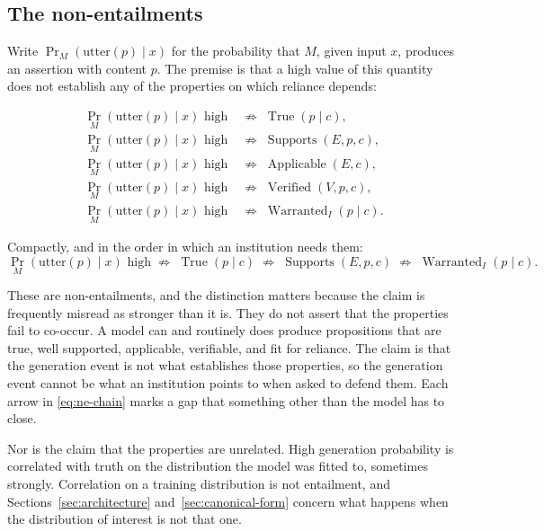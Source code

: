 \documentclass[11pt]{article}
\newcommand{\Supports}{\operatorname{Supports}}
\newcommand{\Applicable}{\operatorname{Applicable}}
\newcommand{\nentails}{\;\not\Rightarrow\;}
\newcommand{\Warranted}{\operatorname{Warranted}}
\newcommand{\Verified}{\operatorname{Verified}}
\newcommand{\True}{\operatorname{True}}
\theoremstyle{plain}
\theoremstyle{definition}
\begin{document}
\subsection{The non-entailments}

Write $\Pr_M(\mathrm{utter}(p) \mid x)$ for the probability that $M$, given input
$x$, produces an assertion with content $p$. The premise is that a high value of
this quantity does not establish any of the properties on which reliance depends:

\begin{align}
  \Pr_M(\mathrm{utter}(p) \mid x) \text{ high}
    &\nentails \True(p \mid c),            \label{eq:ne-true}\\
  \Pr_M(\mathrm{utter}(p) \mid x) \text{ high}
    &\nentails \Supports(E, p, c),         \label{eq:ne-supported}\\
  \Pr_M(\mathrm{utter}(p) \mid x) \text{ high}
    &\nentails \Applicable(E, c),          \label{eq:ne-applicable}\\
  \Pr_M(\mathrm{utter}(p) \mid x) \text{ high}
    &\nentails \Verified(V, p, c),         \label{eq:ne-verified}\\
  \Pr_M(\mathrm{utter}(p) \mid x) \text{ high}
    &\nentails \Warranted_I(p \mid c).     \label{eq:ne-warranted}
\end{align}

Compactly, and in the order in which an institution needs them:
\begin{equation}
  \Pr_M(\mathrm{utter}(p) \mid x) \text{ high}
  \nentails \True(p \mid c)
  \nentails \Supports(E, p, c)
  \nentails \Warranted_I(p \mid c).
  \label{eq:ne-chain}
\end{equation}

These are non-entailments, and the distinction matters because the claim is
frequently misread as stronger than it is. They do not assert that the properties
fail to co-occur. A model can and routinely does produce propositions that are
true, well supported, applicable, verifiable, and fit for reliance. The claim is
that the generation event is not what establishes those properties, so the
generation event cannot be what an institution points to when asked to defend
them. Each arrow in \eqref{eq:ne-chain} marks a gap that something other than the
model has to close.

Nor is the claim that the properties are unrelated. High generation probability is
correlated with truth on the distribution the model was fitted to, sometimes
strongly. Correlation on a training distribution is not entailment, and
Sections~\ref{sec:architecture} and~\ref{sec:canonical-form} concern what happens
when the distribution of interest is not that one.
\end{document}
